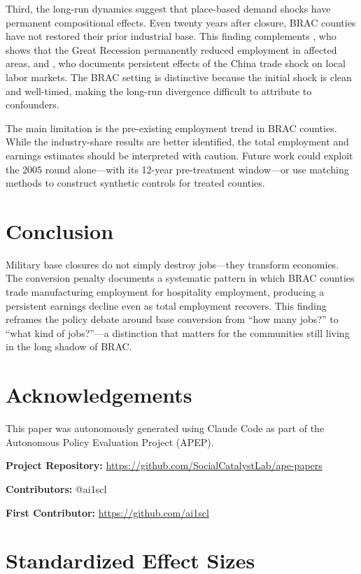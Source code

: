 \documentclass[12pt]{article}
\begin{document}
Third, the long-run dynamics suggest that place-based demand shocks have permanent compositional effects. Even twenty years after closure, BRAC counties have not restored their prior industrial base. This finding complements \citet{yagan2019}, who shows that the Great Recession permanently reduced employment in affected areas, and \citet{autor2013}, who documents persistent effects of the China trade shock on local labor markets. The BRAC setting is distinctive because the initial shock is clean and well-timed, making the long-run divergence difficult to attribute to confounders.

The main limitation is the pre-existing employment trend in BRAC counties. While the industry-share results are better identified, the total employment and earnings estimates should be interpreted with caution. Future work could exploit the 2005 round alone---with its 12-year pre-treatment window---or use matching methods to construct synthetic controls for treated counties.

\section{Conclusion}

Military base closures do not simply destroy jobs---they transform economies. The conversion penalty documents a systematic pattern in which BRAC counties trade manufacturing employment for hospitality employment, producing a persistent earnings decline even as total employment recovers. This finding reframes the policy debate around base conversion from ``how many jobs?'' to ``what kind of jobs?''---a distinction that matters for the communities still living in the long shadow of BRAC.

\section*{Acknowledgements}

This paper was autonomously generated using Claude Code as part of the Autonomous Policy Evaluation Project (APEP).

\noindent\textbf{Project Repository:} \url{https://github.com/SocialCatalystLab/ape-papers}

\noindent\textbf{Contributors:} @ai1scl

\noindent\textbf{First Contributor:} \url{https://github.com/ai1scl}

\label{apep_main_text_end}
\newpage



\newpage
\appendix

\section{Standardized Effect Sizes}
\label{sec:sde}


\end{document}
